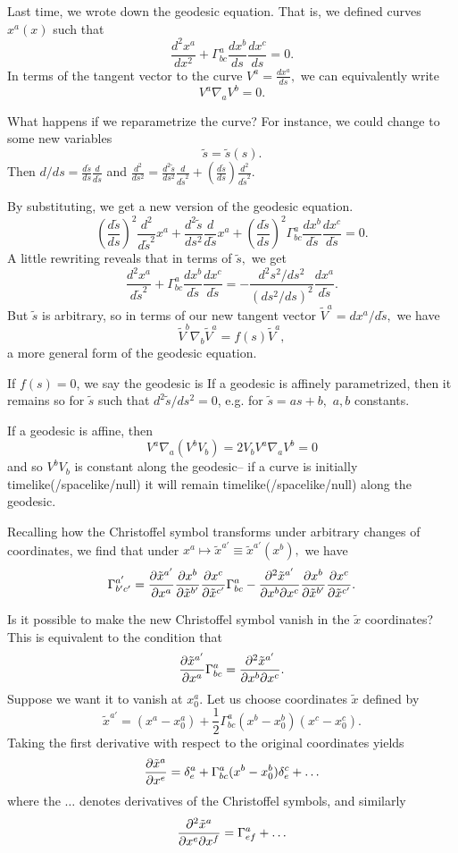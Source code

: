 Last time, we wrote down the geodesic equation. That is, we defined curves $x^a(x)$ such that
$$\frac{d^2x^a}{dx^2}+\Gamma^a_{bc}\frac{dx^b}{ds}\frac{dx^c}{ds}=0.$$
In terms of the tangent vector to the curve $V^a = \frac{dx^a}{ds},$
we can equivalently write
$$V^a\nabla_a V^b=0.$$

What happens if we reparametrize the curve? For instance, we could change to some new variables $$\tilde s=\tilde s(s).$$
Then $d/ds=\frac{d\tilde s}{ds} \frac{d}{d\tilde s}$ and $\frac{d^2}{ds^2}=\frac{d^2 \tilde s}{ds^2}\frac{d}{d\tilde s^2} + (\frac{d\tilde s}{ds})\frac{d^2}{d\tilde s^2}.$

By substituting, we get a new version of the geodesic equation.
$$(\frac{d\tilde s}{ds})^2 \frac{d^2}{d\tilde s^2} x^a+ \frac{d^2\tilde s}{ds^2} \frac{d}{d\tilde s} x^a + (\frac{d\tilde s}{ds})^2 \Gamma^a_{bc} \frac{dx^b}{d\tilde s}\frac{dx^c}{d\tilde s}=0.$$
A little rewriting reveals that in terms of $\tilde s,$ we get
$$\frac{d^2x^a}{d\tilde s^2}+\Gamma^a_{bc} \frac{dx^b}{d\tilde s} \frac{dx^c}{d\tilde s}=-\frac{d^2s^2/ds^2}{(ds^2/ds)^2} \frac{dx^a}{d\tilde s}.$$
But $\tilde s$ is arbitrary, so in terms of our new tangent vector $\tilde V^a=dx^a/d\tilde s,$ we have
$$\tilde V^b \nabla_b \tilde V^a=f(s)\tilde V^a,$$
a more general form of the geodesic equation. 
\begin{defn}
If $f(s)=0$, we say the geodesic is  If a geodesic is affinely parametrized, then it remains so for $\tilde s$ such that $d^2\tilde s/ds^2=0$, e.g. for $\tilde s= as+b,$ $a,b$ constants.
\end{defn}

If a geodesic is affine, then
$$V^a \nabla_a (V^b V_b)=2V_b V^a \nabla _a V^b=0$$ and so $V^b V_b$ is constant along the geodesic-- if a curve is initially timelike(/spacelike/null) it will remain timelike(/spacelike/null) along the geodesic.

Recalling how the Christoffel symbol transforms under arbitrary changes of coordinates, we find that under $x^a \mapsto \tilde x^{a'}\equiv \tilde x^{a'}(x^b),$ we have
$$\Gamma^{a'}_{b'c'}= \frac{\partial \tilde x^{a'}}{\partial x^a}\frac{\partial x^b}{\partial \tilde x^{b'}}\frac{\partial x^c}{\partial \tilde x^{c'}}\Gamma^a_{bc}-\frac{\partial^2 \tilde x^{a'}}{\partial  x^{b} \partial  x^{c}}\frac{\partial x^b}{\partial \tilde x^{b'}}\frac{\partial x^c}{\partial \tilde x^{c'}}.$$

Is it possible to make the new Christoffel symbol vanish in the $\tilde x$ coordinates? This is equivalent to the condition that
$$\frac{\partial \tilde x^{a'}}{\partial x^a} \Gamma^a_{bc}= \frac{\partial^2 \tilde x^{a'}}{\partial x^b \partial x^c}.$$ Suppose we want it to vanish at $x^a_0$. Let us choose coordinates $\tilde x$ defined by
$$\tilde x^{a'}=(x^a-x^a_0)+\frac{1}{2}\Gamma^a_{bc}(x^b-x_0^b)(x^c-x^c_0).$$
Taking the first derivative with respect to the original coordinates yields
$$\frac{\partial \tilde x^a}{\partial x^e}=\delta^a_e +\Gamma^a_{bc}(x^b-x^b_0)\delta^c_e+\ldots$$ where the $\ldots$ denotes derivatives of the Christoffel symbols, and similarly
$$\frac{\partial^2 \tilde x^a}{\partial x^e \partial x^f}=\Gamma^a_{ef}+\ldots$$

